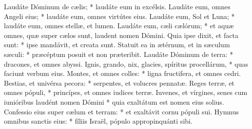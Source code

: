 Laudáte Dóminum de cælis; * laudáte eum in excélsis.
Laudáte eum, omnes Angeli eius; * laudáte eum, omnes virtútes eius.
Laudáte eum, Sol et Luna; * laudáte eum, omnes stellæ, et lumen.
Laudáte eum, cæli cælórum; * et aquæ omnes, quæ super cælos sunt, laudent nomen Dómini.
Quia ipse dixit, et facta sunt: * ipse mandávit, et creata sunt.
Statuit ea in ætérnum, et in sæculum sæculi: * præcéptum posuit et non præteribit.
Laudáte Dóminum de terra: * dracones, et omnes abyssi.
Ignis, grando, nix, glacies, spíritus procellárum, * quas faciunt verbum eius.
Montes, et omnes colles: * ligna fructifera, et omnes cedri.
Bestias, et univérsa pecora: * serpentes, et volucres pennatæ.
Reges terræ, et omnes pópuli, * princípes, et omnes iudices terræ.
Iuvenes, et vírgines, senes cum iunióribus laudént nomen Dómini * quia exaltátum est nomen eius solius.
Confessio eius super cælum et terram: * et exaltávit cornu pópuli sui.
Hymnus omnibus sanctis eius: * fíliis Israël, pópulo appropinquánti sibi.